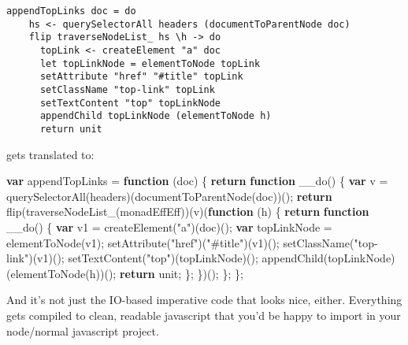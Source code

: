 \documentclass[]{article}
\newenvironment{Shaded}{}{}
\newcommand{\AttributeTok}[1]{\textcolor[rgb]{0.49,0.56,0.16}{#1}}
\newcommand{\ControlFlowTok}[1]{\textcolor[rgb]{0.00,0.44,0.13}{\textbf{#1}}}
\newcommand{\KeywordTok}[1]{\textcolor[rgb]{0.00,0.44,0.13}{\textbf{#1}}}
\newcommand{\NormalTok}[1]{#1}
\newcommand{\OperatorTok}[1]{\textcolor[rgb]{0.40,0.40,0.40}{#1}}
\newcommand{\StringTok}[1]{\textcolor[rgb]{0.25,0.44,0.63}{#1}}
\begin{document}
\begin{verbatim}
appendTopLinks doc = do
    hs <- querySelectorAll headers (documentToParentNode doc)
    flip traverseNodeList_ hs \h -> do
      topLink <- createElement "a" doc
      let topLinkNode = elementToNode topLink
      setAttribute "href" "#title" topLink
      setClassName "top-link" topLink
      setTextContent "top" topLinkNode
      appendChild topLinkNode (elementToNode h)
      return unit
\end{verbatim}

gets translated to:

\begin{Shaded}
\begin{Highlighting}[]
\KeywordTok{var}\NormalTok{ appendTopLinks }\OperatorTok{=} \KeywordTok{function}\NormalTok{ (doc) }\OperatorTok{\{}
    \ControlFlowTok{return} \KeywordTok{function} \AttributeTok{__do}\NormalTok{() }\OperatorTok{\{}
        \KeywordTok{var}\NormalTok{ v }\OperatorTok{=} \AttributeTok{querySelectorAll}\NormalTok{(headers)(}\AttributeTok{documentToParentNode}\NormalTok{(doc))()}\OperatorTok{;}
        \ControlFlowTok{return} \AttributeTok{flip}\NormalTok{(}\AttributeTok{traverseNodeList_}\NormalTok{(monadEffEff))(v)(}\KeywordTok{function}\NormalTok{ (h) }\OperatorTok{\{}
            \ControlFlowTok{return} \KeywordTok{function} \AttributeTok{__do}\NormalTok{() }\OperatorTok{\{}
                \KeywordTok{var}\NormalTok{ v1 }\OperatorTok{=} \AttributeTok{createElement}\NormalTok{(}\StringTok{"a"}\NormalTok{)(doc)()}\OperatorTok{;}
                \KeywordTok{var}\NormalTok{ topLinkNode }\OperatorTok{=} \AttributeTok{elementToNode}\NormalTok{(v1)}\OperatorTok{;}
                \AttributeTok{setAttribute}\NormalTok{(}\StringTok{"href"}\NormalTok{)(}\StringTok{"#title"}\NormalTok{)(v1)()}\OperatorTok{;}
                \AttributeTok{setClassName}\NormalTok{(}\StringTok{"top-link"}\NormalTok{)(v1)()}\OperatorTok{;}
                \AttributeTok{setTextContent}\NormalTok{(}\StringTok{"top"}\NormalTok{)(topLinkNode)()}\OperatorTok{;}
                \AttributeTok{appendChild}\NormalTok{(topLinkNode)(}\AttributeTok{elementToNode}\NormalTok{(h))()}\OperatorTok{;}
                \ControlFlowTok{return}\NormalTok{ unit}\OperatorTok{;}
            \OperatorTok{\};}
        \OperatorTok{\}}\NormalTok{)()}\OperatorTok{;}
    \OperatorTok{\};}
\OperatorTok{\};}
\end{Highlighting}
\end{Shaded}

And it's not just the IO-based imperative code that looks nice, either.
Everything gets compiled to clean, readable javascript that you'd be happy to
import in your node/normal javascript project.
\end{document}
